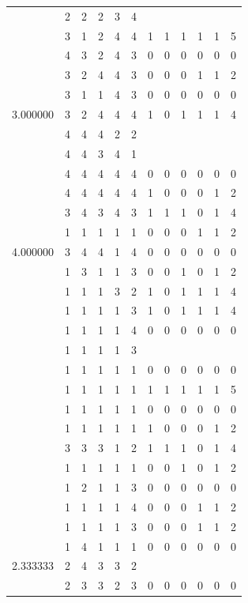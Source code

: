 \documentclass[]{book}
\theoremstyle{definition}
\theoremstyle{definition}
\theoremstyle{definition}
\theoremstyle{remark}
\begin{document}
\begin{table}
{\begin{tabular}[t]{rrrrrrrrrrrr}
 & 2 & 2 & 2 & 3 & 4 &  &  &  &  &  & \\
 & 3 & 1 & 2 & 4 & 4 & 1 & 1 & 1 & 1 & 1 & 5\\
 & 4 & 3 & 2 & 4 & 3 & 0 & 0 & 0 & 0 & 0 & 0\\
 & 3 & 2 & 4 & 4 & 3 & 0 & 0 & 0 & 1 & 1 & 2\\
 & 3 & 1 & 1 & 4 & 3 & 0 & 0 & 0 & 0 & 0 & 0\\
3.000000 & 3 & 2 & 4 & 4 & 4 & 1 & 0 & 1 & 1 & 1 & 4\\
 & 4 & 4 & 4 & 2 & 2 &  &  &  &  &  & \\
 & 4 & 4 & 3 & 4 & 1 &  &  &  &  &  & \\
 & 4 & 4 & 4 & 4 & 4 & 0 & 0 & 0 & 0 & 0 & 0\\
 & 4 & 4 & 4 & 4 & 4 & 1 & 0 & 0 & 0 & 1 & 2\\
 & 3 & 4 & 3 & 4 & 3 & 1 & 1 & 1 & 0 & 1 & 4\\
 & 1 & 1 & 1 & 1 & 1 & 0 & 0 & 0 & 1 & 1 & 2\\
4.000000 & 3 & 4 & 4 & 1 & 4 & 0 & 0 & 0 & 0 & 0 & 0\\
 & 1 & 3 & 1 & 1 & 3 & 0 & 0 & 1 & 0 & 1 & 2\\
 & 1 & 1 & 1 & 3 & 2 & 1 & 0 & 1 & 1 & 1 & 4\\
 & 1 & 1 & 1 & 1 & 3 & 1 & 0 & 1 & 1 & 1 & 4\\
 & 1 & 1 & 1 & 1 & 4 & 0 & 0 & 0 & 0 & 0 & 0\\
 & 1 & 1 & 1 & 1 & 3 &  &  &  &  &  & \\
 & 1 & 1 & 1 & 1 & 1 & 0 & 0 & 0 & 0 & 0 & 0\\
 & 1 & 1 & 1 & 1 & 1 & 1 & 1 & 1 & 1 & 1 & 5\\
 & 1 & 1 & 1 & 1 & 1 & 0 & 0 & 0 & 0 & 0 & 0\\
 & 1 & 1 & 1 & 1 & 1 & 1 & 0 & 0 & 0 & 1 & 2\\
 & 3 & 3 & 3 & 1 & 2 & 1 & 1 & 1 & 0 & 1 & 4\\
 & 1 & 1 & 1 & 1 & 1 & 0 & 0 & 1 & 0 & 1 & 2\\
 & 1 & 2 & 1 & 1 & 3 & 0 & 0 & 0 & 0 & 0 & 0\\
 & 1 & 1 & 1 & 1 & 4 & 0 & 0 & 0 & 1 & 1 & 2\\
 & 1 & 1 & 1 & 1 & 3 & 0 & 0 & 0 & 1 & 1 & 2\\
 & 1 & 4 & 1 & 1 & 1 & 0 & 0 & 0 & 0 & 0 & 0\\
2.333333 & 2 & 4 & 3 & 3 & 2 &  &  &  &  &  & \\
 & 2 & 3 & 3 & 2 & 3 & 0 & 0 & 0 & 0 & 0 & 0\\

\end{tabular}}
\end{table}
\end{document}
